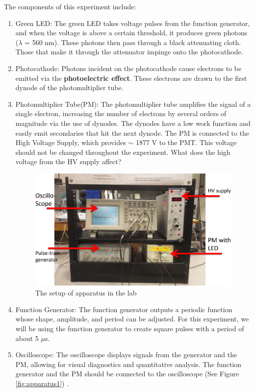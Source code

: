 \documentclass[10pt,aps,twocolumn,secnumarabic,balancelastpage,amsmath,amssymb,nofootinbib,floatfix]{revtex4}
\begin{document}
The components of this experiment include:
\begin{enumerate}

\item Green LED: The green LED takes voltage pulses from the function generator, and when the voltage is above a certain threshold, it produces green photons ($\lambda$ = 560 nm). These photons then pass through a black attenuating cloth. Those that make it through the attenuator impinge onto the photocathode. 

\item Photocathode: Photons incident on the photocathode cause electrons to be emitted via the \textbf{photoelectric effect}. These electrons are drawn to the first dynode of the photomultiplier tube. 

\item Photomultiplier Tube(PM): The photomultiplier tube amplifies the signal of a single electron, increasing the number of electrons by several orders of magnitude via the use of dynodes. The dynodes have a low work function and easily emit secondaries that hit the next dynode. The PM is connected to the High Voltage Supply, which provides $\sim$ 1877 V to the PMT. This voltage should not be changed throughout the experiment. What does the high voltage from the HV supply affect?

\begin{figure}
  \centering
  \includegraphics[width=1.0\linewidth]{figs/apparatus2.png}
  \caption{The setup of apparatus in the lab}
  \label{fig:apparatus2}
\end{figure}

\item Function Generator: The function generator outputs a periodic function whose shape, amplitude, and period can be adjusted. For this experiment, we will be using the function generator to create square pulses with a period of about 5 $\mu$s.

\item Oscilloscope: The oscilloscope displays signals from the generator and the PM, allowing for visual diagnostics and quantitative analysis. The function generator and the PM should be connected to the oscilloscope (See Figure \ref{fig:apparatus1}) \cite{tds2000}. 

\end{enumerate}
\end{document}

